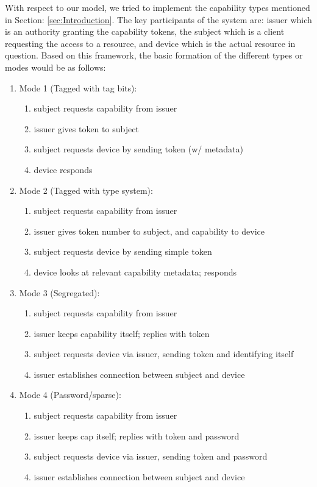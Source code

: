 With respect to our model, we tried to implement the capability types mentioned in Section: \ref{sec:Introduction}. The key participants of the system are: issuer which is an authority granting the capability tokens, the subject which is a client requesting the access to a resource, and device which is the actual resource in question. Based on this framework, the basic formation of the different types or modes would be as follows:
\begin{enumerate}
\item Mode 1 (Tagged with tag bits):
	\begin{enumerate}
		\item subject requests capability from issuer
		\item issuer gives token to subject
		\item subject requests device by sending token (w/ metadata)
		\item device responds
	\end{enumerate}
	
\item Mode 2 (Tagged with type system):
	\begin{enumerate}
		\item subject requests capability from issuer
		\item issuer gives token number to subject, and capability to device
		\item subject requests device by sending simple token
		\item device looks at relevant capability metadata; responds
	\end{enumerate}

\item Mode 3 (Segregated):
	\begin{enumerate}
		\item subject requests capability from issuer
		\item issuer keeps capability itself; replies with token
		\item subject requests device via issuer, sending token and identifying itself
		\item issuer establishes connection between subject and device
	\end{enumerate}

\item Mode 4 (Password/sparse):
	\begin{enumerate}
		\item subject requests capability from issuer
		\item issuer keeps cap itself; replies with token and password
		\item subject requests device via issuer, sending token and password
		\item issuer establishes connection between subject and device
	\end{enumerate}
\end{enumerate}

